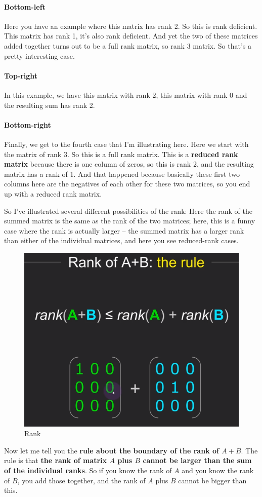 \documentclass[fleqn,10pt]{olplainarticle}
\theoremstyle{definition}
\theoremstyle{remark}
\begin{document}
\paragraph{Bottom-left}

Here you have an example where this matrix has rank 2. So this is rank deficient. This matrix has rank 1, it's also rank deficient. And yet the two of these matrices added together turns out to be a full rank matrix, so rank 3 matrix. So that's a pretty interesting case. 

\paragraph{Top-right}

In this example, we have this matrix with rank 2, this matrix with rank 0 and the resulting sum has rank 2.

\paragraph{Bottom-right}

Finally, we get to the fourth case that I'm illustrating here. Here we start with the matrix of rank 3. So this is a full rank matrix. This is a \textbf{reduced rank matrix} because there is one column of zeros, so this is rank 2, and the resulting matrix has a rank of 1. And that happened because basically these first two columns here are the negatives of each other for these two matrices, so you end up with a reduced rank matrix.

So I've illustrated several different possibilities of the rank: Here the rank of the summed matrix is the same as the rank of the two matrices; here, this is a funny case where the rank is actually larger -- the summed matrix has a larger rank than either of the individual matrices, and here you see reduced-rank cases.

\begin{figure}[ht]
	\centering
	\includegraphics[width=0.3\linewidth]{images/rank-19.png}
	\caption{Rank}
	\label{fig:rank_19}
\end{figure}

Now let me tell you the \textbf{rule about the boundary of the rank of $A + B$}. The rule is that \textbf{the rank of matrix $A$ plus $B$ cannot be larger than the sum of the individual ranks}. So if you know the rank of $A$ and you know the rank of $B$, you add those together, and the rank of $A$ plus $B$ cannot be bigger than this.
\end{document}
